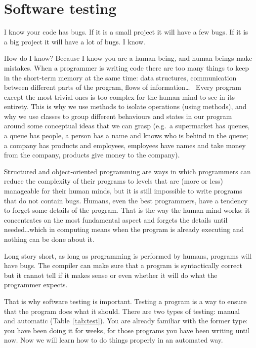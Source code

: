 
%
%
%

\section{Software testing}
\label{sec:software-testing}

I know your code has bugs. If it is a small project it will have a few
bugs. If it is a big project it will have a lot of bugs. I know.

How do I know? Because I know you are a human being, and human beings
make mistakes. When a programmer is writing code there are too
many things to keep in the short-term memory at the same time: data
structures, communication between different parts of the program,
flows of information\ldots ~ Every program except the most trivial ones is
too complex for the human mind to see in its entirety. This is why we
use methods to isolate operations (using methods), and
why we use classes to group different behaviours and states in our program
around some conceptual ideas that we can grasp (e.g.~a supermarket has
queues, a queue has people, a person has a name and knows who is
behind in the queue; a company has products and employees, employees
have names and take money from the company, products give money to the
company). 

Structured and object-oriented programming are ways in which
programmers can reduce the complexity of their programs to levels that
are (more or less) manageable for their human minds, 
but it is still impossible to write
programs that do not contain bugs. Humans, even the best programmers,
have a tendency to forget some details of the program. That is the way
the human mind works: it concentrates on the most fundamental aspect
and forgets the details until needed\ldots which in computing means
when the program is already executing and nothing can be done about
it. 

Long story short, as long as programming is performed by humans,
programs will have bugs. The compiler can make sure that a program is
syntactically correct but it cannot tell if  it makes sense or
even whether it will do what the programmer expects. 

That is why software testing is important. Testing a program is a way
to ensure that the program does what it should. There are two types of
testing: manual and automatic (Table~\ref{tab:test}). You are already
familiar with the former type: you have been doing it for weeks, for
those programs you have been writing until now. Now we will learn how to
do things properly in an automated way. 

